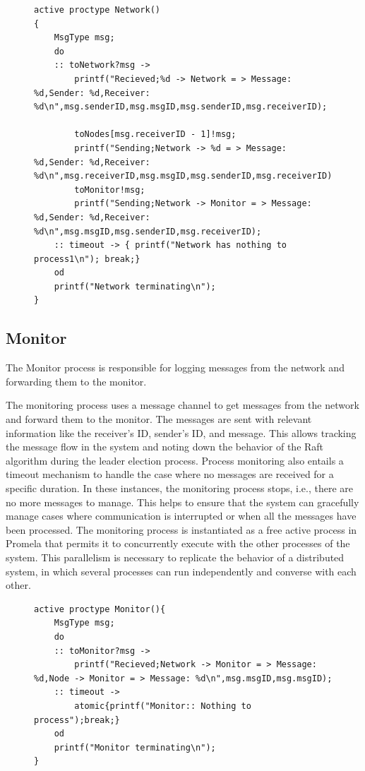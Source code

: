 \documentclass[a4paper]{llncs}
\begin{document}
    \begin{figure}[htbp]
        \centering
        \begin{lstlisting}[style=promela, caption={Network proctype in Promela for message handling}, label={lst:network}]
active proctype Network()  
{  
    MsgType msg;
    do  
    :: toNetwork?msg -> 
        printf("Recieved;%d -> Network = > Message: %d,Sender: %d,Receiver: %d\n",msg.senderID,msg.msgID,msg.senderID,msg.receiverID);
       
        toNodes[msg.receiverID - 1]!msg;
        printf("Sending;Network -> %d = > Message: %d,Sender: %d,Receiver: %d\n",msg.receiverID,msg.msgID,msg.senderID,msg.receiverID);
        toMonitor!msg; 
        printf("Sending;Network -> Monitor = > Message: %d,Sender: %d,Receiver: %d\n",msg.msgID,msg.senderID,msg.receiverID);
    :: timeout -> { printf("Network has nothing to process1\n"); break;}
    od  
    printf("Network terminating\n");
}
\end{lstlisting}
    \end{figure}

    \subsection{Monitor}
    \label{sec:monitor}

The Monitor process is responsible for logging messages from the network and forwarding them to the monitor.

The monitoring process uses a message channel to get messages from the network and forward them to the monitor. The messages are sent with relevant information like the receiver's ID, sender's ID, and message. This allows tracking the message flow in the system and noting down the behavior of the Raft algorithm during the leader election process. Process monitoring also entails a timeout mechanism to handle the case where no messages are received for a specific duration. In these instances, the monitoring process stops, i.e., there are no more messages to manage. This helps to ensure that the system can gracefully manage cases where communication is interrupted or when all the messages have been processed. The monitoring process is instantiated as a free active process in Promela that permits it to concurrently execute with the other processes of the system. This parallelism is necessary to replicate the behavior of a distributed system, in which several processes can run independently and converse with each other.


    \begin{figure}[htbp]
        \centering
        \begin{lstlisting}[style=promela, caption={Monitor process in Promela for logging messages}, label={lst:monitor}]
active proctype Monitor(){
    MsgType msg;
    do
    :: toMonitor?msg ->
        printf("Recieved;Network -> Monitor = > Message: %d,Node -> Monitor = > Message: %d\n",msg.msgID,msg.msgID);
    :: timeout -> 
        atomic{printf("Monitor:: Nothing to process");break;}
    od
    printf("Monitor terminating\n");
}
    \end{lstlisting}
    \end{figure}
\end{document}
